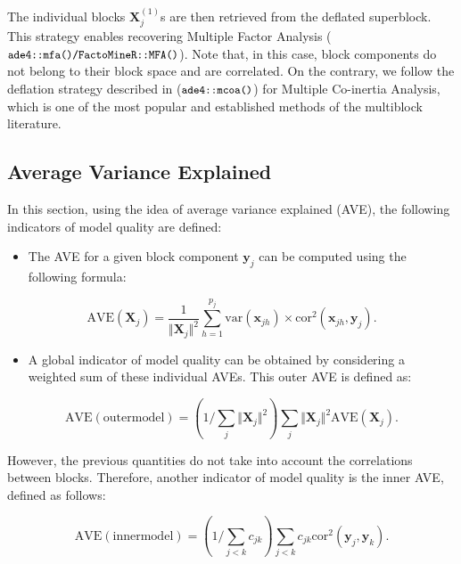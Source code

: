 \documentclass[
]{jss}
\providecommand{\tightlist}{%
  \setlength{\itemsep}{0pt}\setlength{\parskip}{0pt}}
\begin{document}
The individual blocks \(\mathbf X_j^{(1)}\)s are then retrieved from the
deflated superblock. This strategy enables recovering Multiple Factor
Analysis (\(\small{\texttt{ade4::mfa()/FactoMineR::MFA()}}\)). Note
that, in this case, block components do not belong to their block space
and are correlated. On the contrary, we follow the deflation strategy
described in \cite{Chessel1996} (\(\small{\texttt{ade4::mcoa()}}\)) for
Multiple Co-inertia Analysis, which is one of the most popular and
established methods of the multiblock literature.

\hypertarget{average-variance-explained}{%
\subsection{Average Variance
Explained}\label{average-variance-explained}}

In this section, using the idea of average variance explained (AVE), the
following indicators of model quality are defined:

\begin{itemize}
\tightlist
\item
  The AVE for a given block component \(\mathbf{y}_j\) can be computed
  using the following formula:
\end{itemize}

\begin{equation}
\mathrm{AVE}(\mathbf X_j)=  \frac{1}{\Vert \mathbf X_j \Vert^2} \sum_{h=1}^{p_j} \text{var}(\mathbf{x}_{jh}) \times \text{cor}^2(\mathbf{x}_{jh},\mathbf{y}_j).
\label{AVE_X}
\end{equation}

\begin{itemize}
\tightlist
\item
  A global indicator of model quality can be obtained by considering a
  weighted sum of these individual AVEs. This outer AVE is defined as:
\end{itemize}

\begin{equation}
\displaystyle \mathrm{AVE(outer model)} = \left( 1/\sum_j \Vert \mathbf X_j \Vert^2 \right) \sum_j \Vert \mathbf X_j \Vert^2 \mathrm{AVE}(\mathbf X_j).
\label{AVE_outer}
\end{equation}

However, the previous quantities do not take into account the
correlations between blocks. Therefore, another indicator of model
quality is the inner AVE, defined as follows:

\begin{equation}
\displaystyle \mathrm{AVE(inner model)} = \left( 1/\sum_{j<k} c_{jk} \right) \sum_{j<k} c_{jk} \mathrm{cor}^2(\mathbf{y}_j , \mathbf{y}_k).
\label{AVE_inner}
\end{equation}
\end{document}
